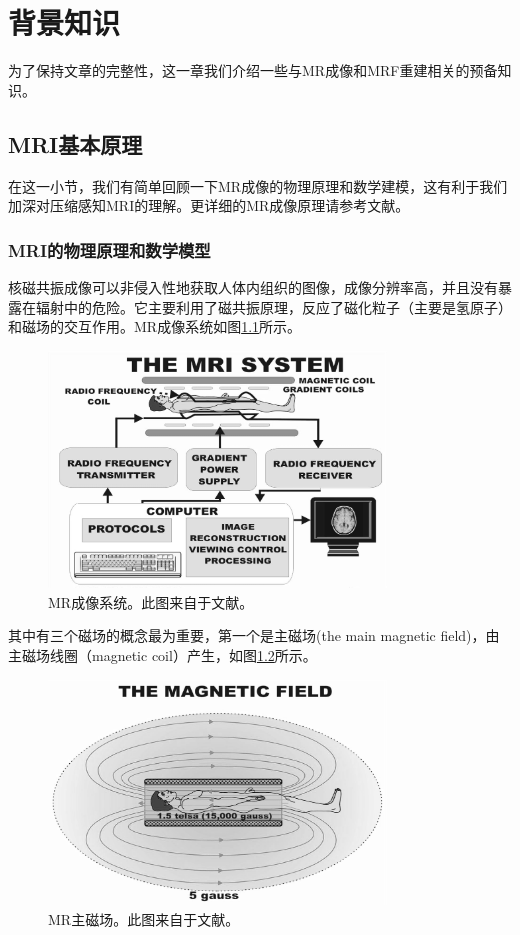 \chapter{背景知识}
\label{chap:pre}
为了保持文章的完整性，这一章我们介绍一些与MR成像和MRF重建相关的预备知识。

\section{MRI基本原理}
\label{sec:mr}
在这一小节，我们有简单回顾一下MR成像的物理原理和数学建模，这有利于我们加深对压缩感知MRI的理解。更详细的MR成像原理请参考文献\cite{mrireview,2009nmr,haacke1999magnetic}。

\subsection{MRI的物理原理和数学模型}
\label{sec:mrimodel}
核磁共振成像可以非侵入性地获取人体内组织的图像，成像分辨率高，并且没有暴露在辐射中的危险。它主要利用了磁共振原理，反应了磁化粒子（主要是氢原子）和磁场的交互作用。MR成像系统如图\ref{fig:system}所示。
\begin{figure}[htbp]
\centering
\includegraphics[width=0.8\textwidth]{img/intro/system.eps}
\caption{MR成像系统。此图来自于文献\cite{sprawls2000magnetic}。}
\label{fig:system}
\end{figure}
其中有三个磁场的概念最为重要，第一个是主磁场(the main magnetic field)，由主磁场线圈（magnetic coil）产生，如图\ref{fig:main}所示。
\begin{figure}[htbp]
\centering
\includegraphics[width=0.8\textwidth]{img/intro/main.eps}
\caption{MR主磁场。此图来自于文献\cite{sprawls2000magnetic}。}
\label{fig:main}
\end{figure}
